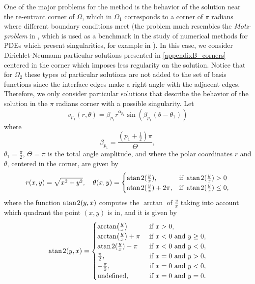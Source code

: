 One of the major problems for the method is the behavior of the solution near the re-entrant corner of \(\Omega\), which in \(\Omega_1\) corresponds to a corner of \(\pi\) radians where different boundary conditions meet (the problem much resembles the \textit{Motz-problem} in \cite{motz1947treatment}, which is used as a benchmark in the study of numerical methods for \acp{PDE} which present singularities, for example in \cite{antunes2010meshfree}).
In this case, we consider Dirichlet-Neumann particular solutions presented in \ref{appendixB_corners} centered in the corner which imposes less regularity on the solution. Notice that for \(\Omega_2\) these types of particular solutions are not added to the set of basis functions since the interface edges make a right angle with the adjacent edges.
Therefore, we only consider particular solutions that describe the behavior of the solution in the \(\pi\) radians corner with a possible singularity. Let
\begin{equation}\label{pat_sol_L_shape_rect}
    v_{p_1}(r, \theta) = \beta_{p_1} r^{\alpha_{p_1}} \sin(\beta_{p_1}(\theta - \theta_1))
\end{equation}
where
\[
    \beta_{p_1} = \frac{(p_1+\frac{1}{2})\pi}{\Theta},
\]
\(\theta_1 = \frac{\pi}{2}\), \(\Theta = \pi\) is the total angle amplitude, and where the polar coordinates \(r\) and \(\theta\), centered in the corner, are given by
\[
    r(x,y) = \sqrt{x^2+y^2}, \quad \theta(x,y)=\begin{cases}
        \operatorname{atan \mspace{2mu} 2}(\frac{y}{x}),& \text{if } \operatorname{atan \mspace{2mu} 2}(\frac{y}{x})>0\\
        \operatorname{atan \mspace{2mu} 2}(\frac{y}{x})+2\pi,& \text{if } \operatorname{atan \mspace{2mu} 2}(\frac{y}{x})\leq0,
    \end{cases}
\]
where the function \(\operatorname{atan \mspace{2mu} 2}(y,x)\) computes the \(\arctan\) of \(\frac{y}{x}\) taking into account which quadrant the point \((x, y)\) is in, and it is given by
\[
    \operatorname{atan \mspace{2mu} 2}(y, x) = \begin{cases}
        \arctan(\frac{y}{x}) &\text{ if } x >0,\\
        \arctan(\frac{y}{x}) + \pi &\text{ if } x < 0 \text{ and } y \geq 0,\\
        \operatorname{atan \mspace{2mu} 2}(\frac{y}{x}) -\pi &\text{ if } x < 0 \text{ and } y < 0,\\
        \frac{\pi}{2}, &\text{ if } x = 0 \text{ and } y > 0, \\
        -\frac{\pi}{2}, &\text{ if } x = 0 \text{ and } y < 0, \\
        \text{undefined}, &\text{ if } x = 0 \text{ and } y = 0.
    \end{cases}
\]
